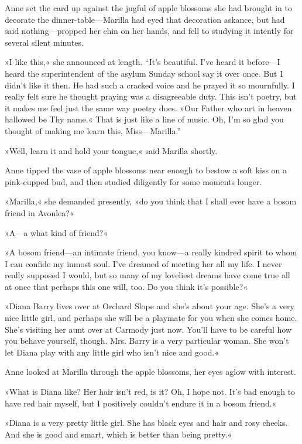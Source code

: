 Anne set the card up against the jugful of apple blossoms she had brought in to decorate the dinner-table—Marilla had eyed that decoration askance, but had said nothing—propped her chin on her hands, and fell to studying it intently for several silent minutes.

»I like this,« she announced at length. “It’s beautiful. I’ve heard it before—I heard the superintendent of the asylum Sunday school say it over once. But I didn’t like it then. He had such a cracked voice and he prayed it so mournfully. I really felt sure he thought praying was a disagreeable duty. This isn’t poetry, but it makes me feel just the same way poetry does. »Our Father who art in heaven hallowed be Thy name.« That is just like a line of music. Oh, I’m so glad you thought of making me learn this, Miss—Marilla.”

»Well, learn it and hold your tongue,« said Marilla shortly.

Anne tipped the vase of apple blossoms near enough to bestow a soft kiss on a pink-cupped bud, and then studied diligently for some moments longer.

»Marilla,« she demanded presently, »do you think that I shall ever have a bosom friend in Avonlea?«

»A—a what kind of friend?«

»A bosom friend—an intimate friend, you know—a really kindred spirit to whom I can confide my inmost soul. I’ve dreamed of meeting her all my life. I never really supposed I would, but so many of my loveliest dreams have come true all at once that perhaps this one will, too. Do you think it’s possible?«

»Diana Barry lives over at Orchard Slope and she’s about your age. She’s a very nice little girl, and perhaps she will be a playmate for you when she comes home. She’s visiting her aunt over at Carmody just now. You’ll have to be careful how you behave yourself, though. Mrs. Barry is a very particular woman. She won’t let Diana play with any little girl who isn’t nice and good.«

Anne looked at Marilla through the apple blossoms, her eyes aglow with interest.

»What is Diana like? Her hair isn’t red, is it? Oh, I hope not. It’s bad enough to have red hair myself, but I positively couldn’t endure it in a bosom friend.«

»Diana is a very pretty little girl. She has black eyes and hair and rosy cheeks. And she is good and smart, which is better than being pretty.«

